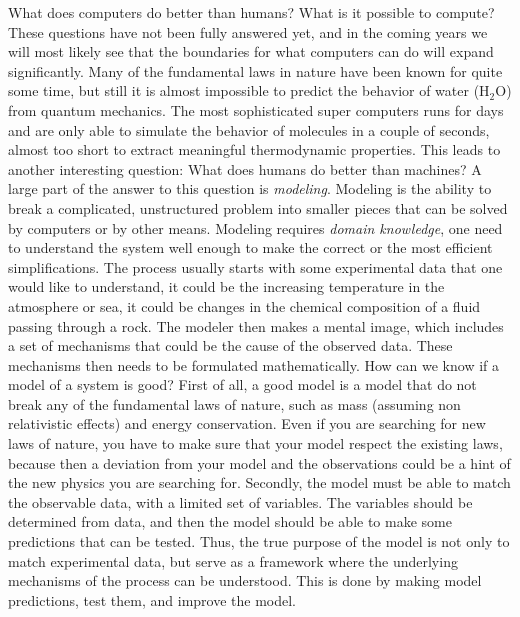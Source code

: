 \documentclass[%
oneside,                 %
final,                   %
10pt]{article}
\begin{document}

\newcommand{\exercisesection}[1]{\subsection*{#1}}




What does computers do better than humans? What is it possible to
compute? These questions have not been fully answered yet, and in the
coming years we will most likely see that the boundaries for what
computers can do will expand significantly. Many of the  fundamental laws in
nature have been known for quite some time, but still it is almost
impossible to predict the behavior of water (H$_2$O) from quantum
mechanics. The most sophisticated super computers runs for days and are
only able to simulate  the behavior of molecules in a couple of
seconds, almost too short to extract meaningful thermodynamic
properties. This leads to another interesting question: What does humans do better
than machines? A large part of
the answer to this question is \emph{modeling}. Modeling is the ability to 
break a complicated, unstructured problem into smaller pieces that can
be solved by computers or by other means. Modeling requires \emph{domain knowledge}, one need to
understand the system well enough to make the correct or the most efficient simplifications. The process usually starts
with some experimental data that one would like to understand, it could be the increasing temperature in the atmosphere or sea, it could 
be changes in the chemical composition of a fluid passing through a rock. The modeler then makes a mental image, which includes a set of 
mechanisms that could be the cause of the observed data. These mechanisms then needs to be formulated mathematically.   
How can we know if a model of a system is good? First of all, a good model is a model that do not break 
any of the fundamental laws of nature, such as mass (assuming non relativistic effects) and energy conservation. Even if you are searching 
for new laws of nature, you have to make sure that your model respect the existing laws, because then a deviation from your model and
the observations could be a hint of the new physics you are searching for.  
Secondly, the model must be able to match the observable data, with a limited set of variables. The variables should 
be determined from data, and then the model should be able to make some predictions that can be tested. Thus, the true
purpose of the model is not only to match experimental data, but serve as a framework where the underlying
mechanisms of the process can be understood. This is done by making model predictions, test them, and improve the model.
\end{document}
